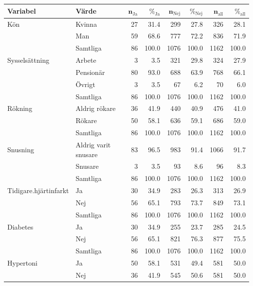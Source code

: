 \begin{table}[ht]
\centering
{\footnotesize
\begin{tabular}{ll|rr|rr|rr}
 \textbf{Variabel} & \textbf{Värde} & $\mathbf{n_{\mathrm{Ja}}}$ & $\mathbf{\%_{\mathrm{Ja}}}$ & $\mathbf{n_{\mathrm{Nej}}}$ & $\mathbf{\%_{\mathrm{Nej}}}$ & $\mathbf{n_{\mathrm{all}}}$ & $\mathbf{\%_{\mathrm{all}}}$ \\ 
  \hline
Kön & Kvinna & 27 & 31.4 & 299 & 27.8 & 326 & 28.1 \\ 
   & Man & 59 & 68.6 & 777 & 72.2 & 836 & 71.9 \\ 
   \hline
 & Samtliga & 86 & 100.0 & 1076 & 100.0 & 1162 & 100.0 \\ 
   \hline
\hline
Sysselsättning & Arbete & 3 & 3.5 & 321 & 29.8 & 324 & 27.9 \\ 
   & Pensionär & 80 & 93.0 & 688 & 63.9 & 768 & 66.1 \\ 
   & Övrigt & 3 & 3.5 & 67 & 6.2 & 70 & 6.0 \\ 
   \hline
 & Samtliga & 86 & 100.0 & 1076 & 100.0 & 1162 & 100.0 \\ 
   \hline
\hline
Rökning & Aldrig rökare & 36 & 41.9 & 440 & 40.9 & 476 & 41.0 \\ 
   & Rökare & 50 & 58.1 & 636 & 59.1 & 686 & 59.0 \\ 
   \hline
 & Samtliga & 86 & 100.0 & 1076 & 100.0 & 1162 & 100.0 \\ 
   \hline
\hline
Snusning & Aldrig varit snusare & 83 & 96.5 & 983 & 91.4 & 1066 & 91.7 \\ 
   & Snusare & 3 & 3.5 & 93 & 8.6 & 96 & 8.3 \\ 
   \hline
 & Samtliga & 86 & 100.0 & 1076 & 100.0 & 1162 & 100.0 \\ 
   \hline
\hline
Tidigare.hjärtinfarkt & Ja & 30 & 34.9 & 283 & 26.3 & 313 & 26.9 \\ 
   & Nej & 56 & 65.1 & 793 & 73.7 & 849 & 73.1 \\ 
   \hline
 & Samtliga & 86 & 100.0 & 1076 & 100.0 & 1162 & 100.0 \\ 
   \hline
\hline
Diabetes & Ja & 30 & 34.9 & 255 & 23.7 & 285 & 24.5 \\ 
   & Nej & 56 & 65.1 & 821 & 76.3 & 877 & 75.5 \\ 
   \hline
 & Samtliga & 86 & 100.0 & 1076 & 100.0 & 1162 & 100.0 \\ 
   \hline
\hline
Hypertoni & Ja & 50 & 58.1 & 531 & 49.4 & 581 & 50.0 \\ 
   & Nej & 36 & 41.9 & 545 & 50.6 & 581 & 50.0 \\ 

\end{tabular}}
\end{table}
